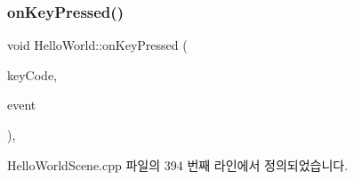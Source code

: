 \subsubsection{\texorpdfstring{on\+Key\+Pressed()}{onKeyPressed()}}
{\footnotesize\ttfamily void Hello\+World\+::on\+Key\+Pressed (\begin{DoxyParamCaption}\item[{\hyperlink{_hello_world_scene_8cpp_a29d93764040e709187aa17656a43405d}{cocos2d\+::\+Event\+Keyboard\+::\+Key\+Code}}]{key\+Code,  }\item[{cocos2d\+::\+Event $\ast$}]{event }\end{DoxyParamCaption})\hspace{0.3cm}{\ttfamily [protected]}, {\ttfamily [virtual]}}



Hello\+World\+Scene.\+cpp 파일의 394 번째 라인에서 정의되었습니다.


